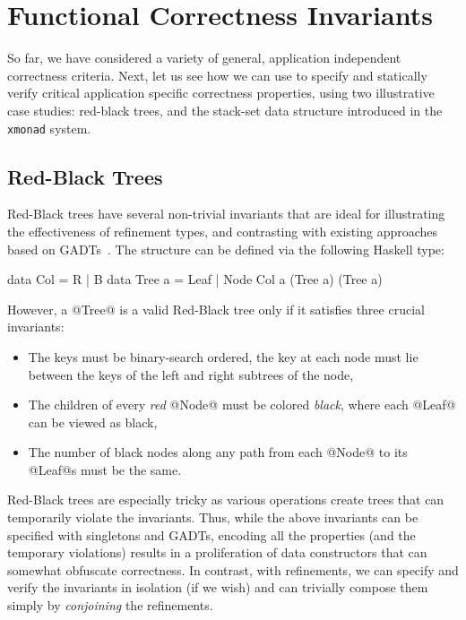 \newcommand\lbxmonad{\texttt{xmonad}\xspace}

\section{Functional Correctness Invariants}\label{sec:structures}

So far, we have considered a variety of general, application independent
correctness criteria. Next, let us see how we can use \toolname to specify 
and statically verify critical application specific correctness properties,
using two illustrative case studies: red-black trees, and the stack-set data
structure introduced in the \lbxmonad system.

\subsection{Red-Black Trees}\label{sec:redblack}

Red-Black trees have several non-trivial invariants that are ideal for 
illustrating the effectiveness of refinement types, and contrasting with
existing approaches based on GADTs~\cite{Kahrs01}.
%
The structure can be defined via the following Haskell type:
%
\begin{code}
  data Col    = R | B
  data Tree a = Leaf 
              | Node Col a (Tree a) (Tree a)
\end{code}
%
However, a @Tree@ is a valid Red-Black tree only if it 
satisfies three crucial invariants:
%
\begin{itemize}
  \item{} 
    The keys must be binary-search ordered, \ie the key at each node must
    lie between the keys of the left and right subtrees of the node,
  \item{}
    The children of every \emph{red} @Node@ must be colored \emph{black}, 
    where each @Leaf@ can be viewed as black,
  \item{}
    The number of black nodes along any path from each @Node@ to its @Leaf@s 
    must be the same.
\end{itemize}

Red-Black trees are especially tricky as various operations create 
trees that can temporarily violate the invariants. Thus, while 
the above invariants can be specified with singletons and GADTs, 
encoding all the properties (and the temporary violations) results
in a proliferation of data constructors that can somewhat obfuscate 
correctness. In contrast, with refinements, we can specify and verify
the invariants in isolation (if we wish) and can trivially compose
them simply by \emph{conjoining} the refinements.

